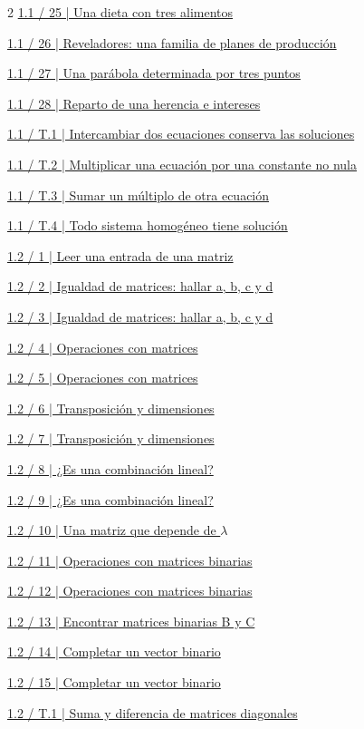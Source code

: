 \documentclass[11pt,a4paper,landscape]{article}
\begin{document}
\begin{multicols}{2}
\hyperlink{1.1-25}{1.1 / 25 | Una dieta con tres alimentos}\par
\hyperlink{1.1-26}{1.1 / 26 | Reveladores: una familia de planes de producción}\par
\hyperlink{1.1-27}{1.1 / 27 | Una parábola determinada por tres puntos}\par
\hyperlink{1.1-28}{1.1 / 28 | Reparto de una herencia e intereses}\par
\hyperlink{1.1-T.1}{1.1 / T.1 | Intercambiar dos ecuaciones conserva las soluciones}\par
\hyperlink{1.1-T.2}{1.1 / T.2 | Multiplicar una ecuación por una constante no nula}\par
\hyperlink{1.1-T.3}{1.1 / T.3 | Sumar un múltiplo de otra ecuación}\par
\hyperlink{1.1-T.4}{1.1 / T.4 | Todo sistema homogéneo tiene solución}\par
\hyperlink{1.2-1}{1.2 / 1 | Leer una entrada de una matriz}\par
\hyperlink{1.2-2}{1.2 / 2 | Igualdad de matrices: hallar a, b, c y d}\par
\hyperlink{1.2-3}{1.2 / 3 | Igualdad de matrices: hallar a, b, c y d}\par
\hyperlink{1.2-4}{1.2 / 4 | Operaciones con matrices}\par
\hyperlink{1.2-5}{1.2 / 5 | Operaciones con matrices}\par
\hyperlink{1.2-6}{1.2 / 6 | Transposición y dimensiones}\par
\hyperlink{1.2-7}{1.2 / 7 | Transposición y dimensiones}\par
\hyperlink{1.2-8}{1.2 / 8 | ¿Es una combinación lineal?}\par
\hyperlink{1.2-9}{1.2 / 9 | ¿Es una combinación lineal?}\par
\hyperlink{1.2-10}{1.2 / 10 | Una matriz que depende de $\lambda$}\par
\hyperlink{1.2-11}{1.2 / 11 | Operaciones con matrices binarias}\par
\hyperlink{1.2-12}{1.2 / 12 | Operaciones con matrices binarias}\par
\hyperlink{1.2-13}{1.2 / 13 | Encontrar matrices binarias B y C}\par
\hyperlink{1.2-14}{1.2 / 14 | Completar un vector binario}\par
\hyperlink{1.2-15}{1.2 / 15 | Completar un vector binario}\par
\hyperlink{1.2-T.1}{1.2 / T.1 | Suma y diferencia de matrices diagonales}\par

\end{multicols}
\end{document}
